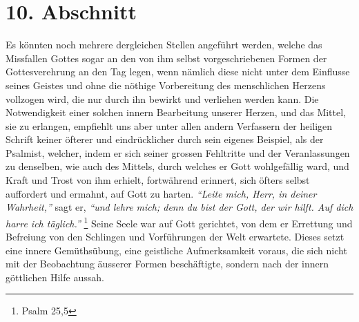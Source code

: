 \section{10. Abschnitt} \label{kap6_ab10}
Es könnten noch mehrere dergleichen Stellen
angeführt werden, welche das
Missfallen Gottes sogar an den von ihm selbst vorgeschriebenen Formen der
Gottesverehrung an den Tag legen, wenn nämlich diese nicht
unter dem Einflusse seines Geistes und ohne die nöthige Vorbereitung des
menschlichen Herzens vollzogen wird, die nur durch ihn bewirkt und verliehen
werden kann. Die Notwendigkeit einer solchen innern Bearbeitung unserer Herzen,
und das Mittel, sie zu erlangen, empfiehlt
uns aber unter allen andern Verfassern der heiligen Schrift keiner öfterer und
eindrücklicher durch sein eigenes Beispiel, als der
Psalmist, welcher, indem
er sich seiner grossen Fehltritte und der Veranlassungen zu denselben, wie auch
des Mittels, durch welches er Gott wohlgefällig ward, und Kraft und Trost von
ihm erhielt, fortwährend erinnert, sich öfters selbst auffordert und ermahnt,
auf Gott zu harten.
\textit{"`Leite mich, Herr, in deiner Wahrheit,"'}  sagt er,
\textit{"`und lehre mich; denn du bist der Gott, der wir hilft. Auf dich harre
ich
täglich."'}
\footnote{Psalm 25,5}
Seine Seele war auf Gott gerichtet, von dem er
Errettung und Befreiung von den Schlingen und Vorführungen der Welt erwartete.
Dieses setzt eine innere Gemüthsübung, eine geistliche Aufmerksamkeit voraus,
die sich nicht mit der Beobachtung äusserer Formen beschäftigte, sondern nach
der innern göttlichen Hilfe aussah.

\medskip

